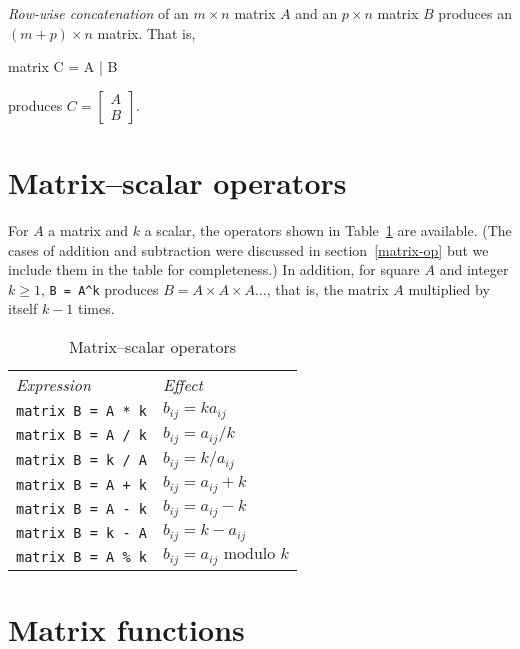 \textit{Row-wise concatenation} of an $m\times n$ matrix $A$ and
an $p\times n$ matrix $B$ produces an $(m+p) \times n$ matrix.
That is,
%
\begin{code}
matrix C = A | B
\end{code}
% 
produces $C = \left[ \begin{array}{cc} A \\ B \end{array} \right]$.

\section{Matrix--scalar operators}
\label{matrix-scalar-op}

For $A$ a matrix and $k$ a scalar, the operators shown in
Table~\ref{tab:matrix-scalar-ops} are available.  (The cases of
addition and subtraction were discussed in section~\ref{matrix-op} but
we include them in the table for completeness.)  In addition, for
square $A$ and integer $k \geq 1$, \verb|B = A^k| produces $B = A
\times A \times A\dots$, that is, the matrix $A$ multiplied by itself
$k-1$ times.

\begin{table}[htbp]
\centering
\begin{tabular}{ll}
\textit{Expression} & \textit{Effect} \\[4pt]
\texttt{matrix B = A * k} & $b_{ij} = k a_{ij}$ \\
\texttt{matrix B = A / k} & $b_{ij} = a_{ij} / k$ \\
\texttt{matrix B = k / A} & $b_{ij} = k / a_{ij}$ \\
\texttt{matrix B = A + k} & $b_{ij} = a_{ij} + k$ \\
\texttt{matrix B = A - k} & $b_{ij} = a_{ij} - k$ \\
\texttt{matrix B = k - A} & $b_{ij} = k - a_{ij}$ \\
\texttt{matrix B = A \% k} & $b_{ij} = a_{ij} \mbox{ modulo } k$ \\
\end{tabular}
\caption{Matrix--scalar operators}
\label{tab:matrix-scalar-ops}
\end{table}


\section{Matrix functions}
\label{matrix-func}

